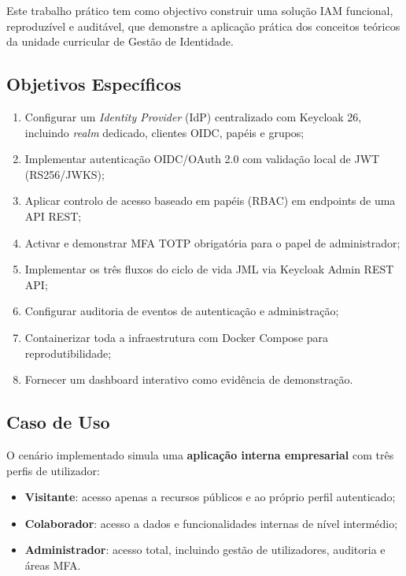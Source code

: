 \documentclass[12pt,a4paper]{article}
\begin{document}
Este trabalho prático tem como objectivo construir uma solução IAM funcional, reproduzível e auditável, que demonstre a aplicação prática dos conceitos teóricos da unidade curricular de Gestão de Identidade.

\subsection{Objetivos Específicos}

\begin{enumerate}[leftmargin=1.5cm]
  \item Configurar um \textit{Identity Provider} (IdP) centralizado com Keycloak 26, incluindo \textit{realm} dedicado, clientes OIDC, papéis e grupos;
  \item Implementar autenticação OIDC/OAuth 2.0 com validação local de JWT (RS256/JWKS);
  \item Aplicar controlo de acesso baseado em papéis (RBAC) em endpoints de uma API REST;
  \item Activar e demonstrar MFA TOTP obrigatória para o papel de administrador;
  \item Implementar os três fluxos do ciclo de vida JML via Keycloak Admin REST API;
  \item Configurar auditoria de eventos de autenticação e administração;
  \item Containerizar toda a infraestrutura com Docker Compose para reprodutibilidade;
  \item Fornecer um dashboard interativo como evidência de demonstração.
\end{enumerate}

\subsection{Caso de Uso}

O cenário implementado simula uma \textbf{aplicação interna empresarial} com três perfis de utilizador:

\begin{itemize}[leftmargin=1.5cm]
  \item \textbf{Visitante}: acesso apenas a recursos públicos e ao próprio perfil autenticado;
  \item \textbf{Colaborador}: acesso a dados e funcionalidades internas de nível intermédio;
  \item \textbf{Administrador}: acesso total, incluindo gestão de utilizadores, auditoria e áreas MFA.
\end{itemize}
\end{document}
